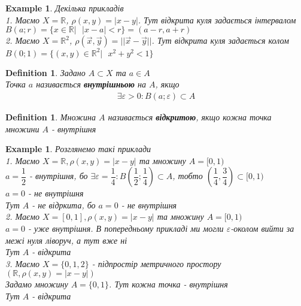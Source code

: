 \documentclass[a4paper, 14pt]{extarticle}
\theoremstyle{theoremdd}
\theoremstyle{theoremdd}
\newtheorem{definition}[theorem]{Definition}
\theoremstyle{theoremdd}
\theoremstyle{theoremdd}
\newtheorem{example}[theorem]{Example}
\theoremstyle{theoremdd}
\theoremstyle{theoremdd}
\theoremstyle{theoremdd}
\theoremstyle{theoremdd}
\begin{document}
\begin{example} Декілька прикладів\\
1. Маємо $X = \mathbb{R}$, $\rho(x,y) = |x-y|$. Тут відкрита куля задається інтервалом\\
$B(a;r) = \{x \in \mathbb{R} | \text{ } |x-a| < r\} = (a-r,a+r)$
\bigskip \\
2. Маємо $X = \mathbb{R}^2$, $\rho(\vec{x}, \vec{y}) = ||\vec{x}-\vec{y}||$. Тут відкрита куля задається колом\\
$B(0;1) = \{(x,y) \in \mathbb{R}^2 | \text{ } x^2+y^2 <1 \}$
\end{example}

\begin{definition}
Задано $A \subset X$ та $a \in A$\\
Точка $a$ називається \textbf{внутрішньою} на $A$, якщо
\begin{align*}
\exists \varepsilon > 0: B(a; \varepsilon) \subset A
\end{align*}
\end{definition}

\begin{definition}
Множина $A$ називається \textbf{відкритою}, якщо кожна точка множини $A$ - внутрішня
\end{definition}

\begin{example} Розглянемо такі приклади \\
1. Маємо $X = \mathbb{R}, \rho(x,y) = |x-y|$ та множину $A = [0,1)$\\
$a = \dfrac{1}{2}$ - внутрішня, бо $\exists \varepsilon = \dfrac{1}{4}: B\left(\dfrac{1}{2}; \dfrac{1}{4} \right) \subset A$, тобто $\left( \dfrac{1}{4}, \dfrac{3}{4} \right) \subset [0,1)$\\
$a = 0$ - не внутрішня\\
Тут $A$ - не відркита, бо $a = 0$ - не внутрішня
\bigskip \\
2. Маємо $X = [0,1], \rho(x,y) = |x-y|$ та множину $A = [0,1)$\\
$a = 0$ - уже внутрішня. В попередньому прикладі ми могли $\varepsilon$-околом вийти за межі нуля ліворуч, а тут вже ні\\
Тут $A$ - відкрита
\bigskip \\
3. Маємо $X = \{0,1,2\}$ - підпростір метричного простору \\ $(\mathbb{R}, \rho(x,y) = |x-y|)$\\
Задамо множину $A = \{0,1\}$. Тут кожна точка - внутрішня\\
Тут $A$ - відкрита
\end{example}
\end{document}

